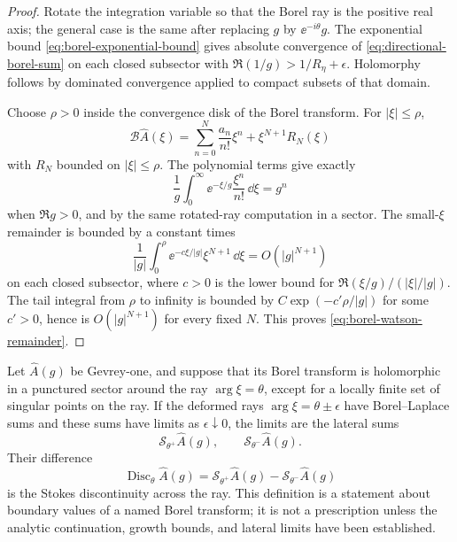 \begin{proof}
Rotate the integration variable so that the Borel ray is the positive real
axis; the general case is the same after replacing \(g\) by
\(\ee^{-i\theta}g\).  The exponential bound
\eqref{eq:borel-exponential-bound} gives absolute convergence of
\eqref{eq:directional-borel-sum} on each closed subsector with
\(\Re(1/g)>1/R_\eta+\epsilon\).  Holomorphy follows by dominated convergence
applied to compact subsets of that domain.

Choose \(\rho>0\) inside the convergence disk of the Borel transform.  For
\(|\xi|\le\rho\),
\[
  \mathcal B\widehat A(\xi)
  =
  \sum_{n=0}^N\frac{a_n}{n!}\xi^n+\xi^{N+1}R_N(\xi)
\]
with \(R_N\) bounded on \(|\xi|\le\rho\).  The polynomial terms give exactly
\[
  \frac1g\int_0^\infty \ee^{-\xi/g}\frac{\xi^n}{n!}\,\dd\xi
  =
  g^n
\]
when \(\Re g>0\), and by the same rotated-ray computation in a sector.  The
small-\(\xi\) remainder is bounded by a constant times
\[
  \frac1{|g|}\int_0^\rho
  \ee^{-c\xi/|g|}\xi^{N+1}\,\dd\xi
  =
  O(|g|^{N+1})
\]
on each closed subsector, where \(c>0\) is the lower bound for
\(\Re(\xi/g)/(|\xi|/|g|)\).  The tail integral from \(\rho\) to infinity is
bounded by \(C\exp(-c'\rho/|g|)\) for some \(c'>0\), hence is
\(O(|g|^{N+1})\) for every fixed \(N\).  This proves
\eqref{eq:borel-watson-remainder}.
\end{proof}

\begin{definition}
\label{def:lateral-borel-sums-stokes-discontinuity}
Let \(\widehat A(g)\) be Gevrey-one, and suppose that its Borel transform is
holomorphic in a punctured sector around the ray
\(\arg\xi=\theta\), except for a locally finite set of singular points on the
ray.  If the deformed rays
\(\arg\xi=\theta\pm\epsilon\) have Borel--Laplace sums and these sums have
limits as \(\epsilon\downarrow0\), the limits are the lateral sums
\[
  \mathcal S_{\theta^+}\widehat A(g),
  \qquad
  \mathcal S_{\theta^-}\widehat A(g).
\]
Their difference
\begin{equation}
  \operatorname{Disc}_\theta \widehat A(g)
  =
  \mathcal S_{\theta^+}\widehat A(g)
  -
  \mathcal S_{\theta^-}\widehat A(g)
  \label{eq:borel-stokes-discontinuity}
\end{equation}
is the Stokes discontinuity across the ray.  This definition is a statement
about boundary values of a named Borel transform; it is not a prescription
unless the analytic continuation, growth bounds, and lateral limits have been
established.
\end{definition}

